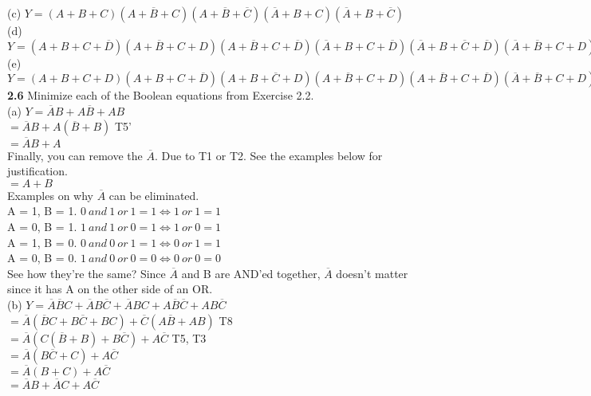 \documentclass[12pt,a4paper]{report}
\newcommand*{\al}{\overline{A}}
\newcommand*{\bl}{\overline{B}}
\newcommand*{\cl}{\overline{C}}
\begin{document}
\begin{normalsize}
(c) $ Y = (A + B + C) (A + \overline{B} + C) (A + \overline{B} + \overline{C}) (\overline{A} + B + C) (\overline{A} + B + \overline{C}) $ \\

(d) $ Y = (A + B + C + \overline{D}) (A + \overline{B} + C + D) (A + \overline{B} + C + \overline{D}) (\overline{A} + B + C + \overline{D}) (\overline{A} + B + \overline{C} + \overline{D}) (\overline{A} + \overline{B} + C + D) (\overline{A} + \overline{B} + C + \overline{D}) (\overline{A} + \overline{B} + \overline{C} + D) (\overline{A} + \overline{B} + \overline{C} + \overline{D}) $ \\

(e) $ Y = (A + B + C + D) (A + B + C + \overline{D}) (A + B + \overline{C} + D) (A + \overline{B} + C + D) (A + \overline{B} + C + \overline{D}) (\overline{A} + \overline{B} + C + D) (\overline{A} + \overline{B} + C + \overline{D}) (\overline{A} + \overline{B} + \overline{C} + D) (\overline{A} + \overline{B} + \overline{C} + \overline{D}) $ \\

\textbf{2.6} Minimize each of the Boolean equations from Exercise 2.2. \\
(a) $ Y = \overline{A}B + A\overline{B} + AB $ \\
$ = \al{}B + A(\bl{}+B) $ T5'\\
$ = \al{}B + A $ \\
Finally, you can remove the $ \al{} $. Due to T1 or T2. See the examples below for justification.\\
$ = A + B $ \\
Examples on why $ \al{} $ can be eliminated. \\
A = 1, B = 1. $ 0\: and\: 1\: or\: 1 = 1 \Leftrightarrow 1\: or\: 1 = 1 $ \\
A = 0, B = 1. $ 1\: and\: 1\: or\: 0 = 1 \Leftrightarrow 1\: or\: 0 = 1 $ \\
A = 1, B = 0. $ 0\: and\: 0\: or\: 1 = 1 \Leftrightarrow 0\: or\: 1 = 1 $ \\
A = 0, B = 0. $ 1\: and\: 0\: or\: 0 = 0 \Leftrightarrow 0\: or\: 0 = 0 $ \\
See how they're the same? Since $ \al{} $ and B are AND'ed together, $ \al{} $ doesn't matter since it has A on the other side of an OR. \\

(b) $ Y = \overline{A}\overline{B}C + \overline{A}B\overline{C} + \overline{A}BC + A\overline{B}\overline{C} + AB\overline{C}$ \\
$ = \al{}(\bl{}C + B\cl{} + BC) + \cl{}(A\bl{} + AB) $ T8 \\
$ = \al{}(C(\bl{}+B) + B\cl{}) + A\cl{} $ T5, T3 \\
$ = \al{}(B\cl{} + C) + A\cl{} $ \\
$ = \al{}(B + C) + A\cl{} $ \\
$ = \al{}B + \al{}C + A\cl{} $ \\


\end{normalsize}
\end{document}
